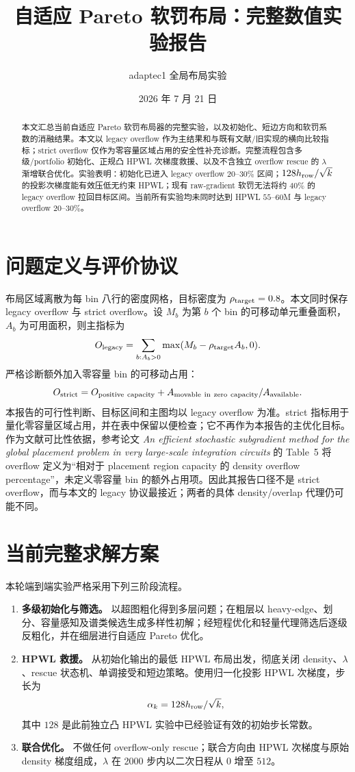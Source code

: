\documentclass[11pt,a4paper]{ctexart}
\title{自适应 Pareto 软罚布局：完整数值实验报告}
\author{adaptec1 全局布局实验}
\date{2026 年 7 月 21 日}
\begin{document}
\maketitle

\begin{abstract}
本文汇总当前自适应 Pareto 软罚布局器的完整实验，以及初始化、短边方向和软罚系数的消融结果。本文以 legacy overflow 作为主结果和与既有文献/旧实现的横向比较指标；strict overflow 仅作为零容量区域占用的安全性补充诊断。完整流程包含多级/portfolio 初始化、正规凸 HPWL 次梯度救援、以及不含独立 overflow rescue 的 $\lambda$ 渐增联合优化。实验表明：初始化已进入 legacy overflow $20$--$30\%$ 区间；$128h_{\rm row}/\sqrt{k}$ 的投影次梯度能有效压低无约束 HPWL；现有 raw-gradient 软罚无法将约 $40\%$ 的 legacy overflow 拉回目标区间。当前所有实验均未同时达到 HPWL $55$--$60$M 与 legacy overflow $20$--$30\%$。
\end{abstract}

\section{问题定义与评价协议}
布局区域离散为每 bin 八行的密度网格，目标密度为 $\rho_{\rm target}=0.8$。本文同时保存 legacy overflow 与 strict overflow。设 $M_b$ 为第 $b$ 个 bin 的可移动单元重叠面积，$A_b$ 为可用面积，则主指标为
\[
O_{\rm legacy}=\sum_{b:A_b>0}\max(M_b-\rho_{\rm target}A_b,0).
\]
严格诊断额外加入零容量 bin 的可移动占用：
\[
O_{\rm strict}=O_{\rm positive\ capacity}+A_{\rm movable\ in\ zero\ capacity}/A_{\rm available}.
\]
本报告的可行性判断、目标区间和主图均以 legacy overflow 为准。strict 指标用于量化零容量区域占用，并在表中保留以便检查；它不再作为本报告的主优化目标。作为文献可比性依据，参考论文 \emph{An efficient stochastic subgradient method for the global placement problem in very large-scale integration circuits} 的 Table~5 将 overflow 定义为“相对于 placement region capacity 的 density overflow percentage”，未定义零容量 bin 的额外占用项。因此其报告口径不是 strict overflow，而与本文的 legacy 协议最接近；两者的具体 density/overlap 代理仍可能不同。

\section{当前完整求解方案}
本轮端到端实验严格采用下列三阶段流程。
\begin{enumerate}
  \item \textbf{多级初始化与筛选。} 以超图粗化得到多层问题；在粗层以 heavy-edge、划分、容量感知及谱类候选生成多样性初解；经短程优化和轻量代理筛选后逐级反粗化，并在细层进行自适应 Pareto 优化。
  \item \textbf{HPWL 救援。} 从初始化输出的最低 HPWL 布局出发，彻底关闭 density、$\lambda$、rescue 状态机、单调接受和短边策略。使用归一化投影 HPWL 次梯度，步长为
  \[\alpha_k=128h_{\rm row}/\sqrt{k},\]
  其中 $128$ 是此前独立凸 HPWL 实验中已经验证有效的初始步长常数。
  \item \textbf{联合优化。} 不做任何 overflow-only rescue；联合方向由 HPWL 次梯度与原始 density 梯度组成，$\lambda$ 在 2000 步内以二次日程从 $0$ 增至 $512$。
\end{enumerate}
\end{document}
